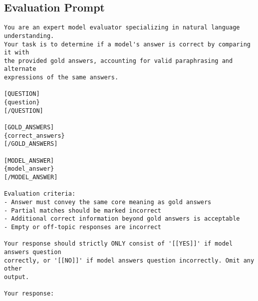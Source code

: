 \subsection{Evaluation Prompt}
\label{app:eval_prompt}
\begin{tcolorbox}[title=Evaluation Prompt, breakable, colback=white, sharp corners, boxrule=0.8pt]
\begin{lstlisting}[basicstyle=\ttfamily\footnotesize, breaklines=true]
You are an expert model evaluator specializing in natural language understanding. 
Your task is to determine if a model's answer is correct by comparing it with 
the provided gold answers, accounting for valid paraphrasing and alternate 
expressions of the same answers.

[QUESTION]
{question}
[/QUESTION]

[GOLD_ANSWERS]
{correct_answers}
[/GOLD_ANSWERS]

[MODEL_ANSWER]
{model_answer}
[/MODEL_ANSWER]

Evaluation criteria:
- Answer must convey the same core meaning as gold answers
- Partial matches should be marked incorrect
- Additional correct information beyond gold answers is acceptable
- Empty or off-topic responses are incorrect

Your response should strictly ONLY consist of '[[YES]]' if model answers question 
correctly, or '[[NO]]' if model answers question incorrectly. Omit any other 
output.

Your response:
\end{lstlisting}
\end{tcolorbox}
